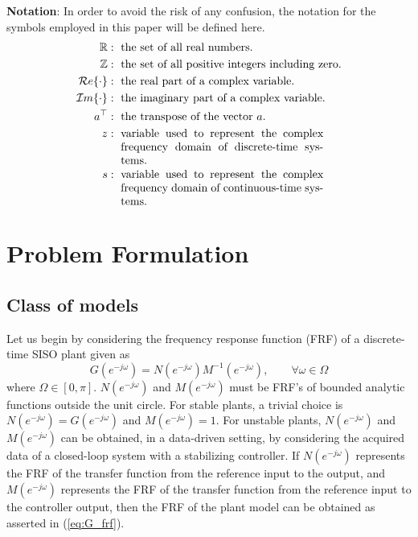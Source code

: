 \documentclass[a4paper, 10pt, conference]{ieeeconf}
\begin{document}
\textbf{Notation}: In order to avoid the risk of any confusion, the notation for the symbols employed in this paper will be defined here.
\begin{align*}
\mathbb{R} &: \ \mbox{the set of all real numbers.} \\
\mathbb{Z} &: \ \mbox{the set of all positive integers including zero.} \\
\mathcal{R}e\{\cdot \} &: \ \mbox{the real part of a complex variable.} \\
\mathcal{I}m\{\cdot \} &: \ \mbox{the imaginary part of a complex variable.} \\
a^{\top} &: \ \mbox{the transpose of the vector }a. \\
z &: \ \parbox[t]{18em}{variable used to represent the complex frequency domain of discrete-time systems.} \\
s &: \ \parbox[t]{18em}{variable used to represent the complex frequency domain of continuous-time systems.}
\end{align*} 


\section{Problem Formulation}
\label{sec:2}


\subsection{Class of models}
\label{sec:21}
Let us begin by considering the frequency response function (FRF) of a discrete-time SISO plant given as
\begin{equation}\label{eq:G_frf}
G(e^{-j\omega}) = N(e^{-j\omega}) M^{-1}(e^{-j\omega}), \qquad \forall \omega \in \Omega
\end{equation}
where $\Omega \in [0,\pi]$. $N(e^{-j\omega})$ and $M(e^{-j\omega})$ must be FRF's of bounded analytic functions outside the unit circle. For stable plants, a trivial choice is $N(e^{-j\omega})=G(e^{-j\omega})$ and $M(e^{-j\omega})=1$. For unstable plants, $N(e^{-j\omega})$ and $M(e^{-j\omega})$ can be obtained, in a data-driven setting, by considering the acquired data of a closed-loop system with a stabilizing controller. If $N(e^{-j\omega})$ represents the FRF of the transfer function from the reference input to the output, and $M(e^{-j\omega})$ represents the FRF of the transfer function from the reference input to the controller output, then the FRF of the plant model can be obtained as asserted in (\ref{eq:G_frf}).
\end{document}
